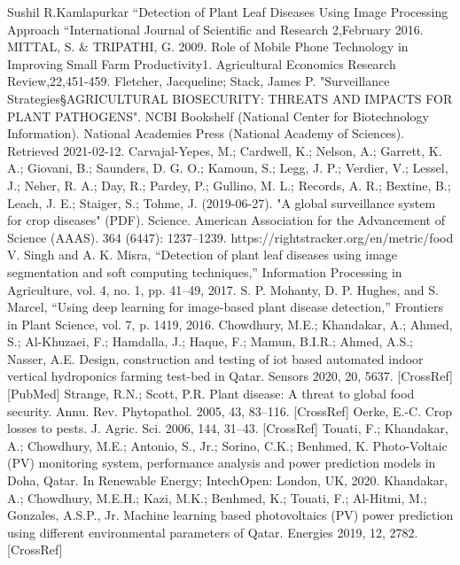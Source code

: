 \documentclass[11pt]{report}
\begin{document}
\begin{thebibliography}{100}  %

	 Sushil R.Kamlapurkar “Detection of Plant Leaf Diseases
	Using Image Processing Approach “International Journal of Scientific and Research 2,February 2016.
	 MITTAL, S. \& TRIPATHI, G. 2009. Role of Mobile Phone Technology in Improving Small Farm Productivity1. Agricultural Economics Research Review,22,451-459.
	  Fletcher, Jacqueline; Stack, James P. "Surveillance Strategies§AGRICULTURAL BIOSECURITY: THREATS AND IMPACTS FOR PLANT PATHOGENS". NCBI Bookshelf (National Center for Biotechnology Information). National Academies Press (National Academy of Sciences). Retrieved 2021-02-12.
	 Carvajal-Yepes, M.; Cardwell, K.; Nelson, A.; Garrett, K. A.; Giovani, B.; Saunders, D. G. O.; Kamoun, S.; Legg, J. P.; Verdier, V.; Lessel, J.; Neher, R. A.; Day, R.; Pardey, P.; Gullino, M. L.; Records, A. R.; Bextine, B.; Leach, J. E.; Staiger, S.; Tohme, J. (2019-06-27). "A global surveillance system for crop diseases" (PDF). Science. American Association for the Advancement of Science (AAAS). 364 (6447): 1237–1239. 
	 https://rightstracker.org/en/metric/food
	 V. Singh and A. K. Misra, “Detection of plant leaf diseases using image segmentation and soft computing techniques,” Information Processing in Agriculture, vol. 4, no. 1, pp. 41–49, 2017. 
	 S. P. Mohanty, D. P. Hughes, and S. Marcel, “Using deep learning for image-based plant disease detection,” Frontiers in Plant Science, vol. 7, p. 1419, 2016.
	 Chowdhury, M.E.; Khandakar, A.; Ahmed, S.; Al-Khuzaei, F.; Hamdalla, J.; Haque, F.; Mamun, B.I.R.; Ahmed, A.S.; Nasser, A.E.
	Design, construction and testing of iot based automated indoor vertical hydroponics farming test-bed in Qatar. Sensors 2020, 20,
	5637. [CrossRef] [PubMed]
	 Strange, R.N.; Scott, P.R. Plant disease: A threat to global food security. Annu. Rev. Phytopathol. 2005, 43, 83–116. [CrossRef]
	 Oerke, E.-C. Crop losses to pests. J. Agric. Sci. 2006, 144, 31–43. [CrossRef]
	 Touati, F.; Khandakar, A.; Chowdhury, M.E.; Antonio, S., Jr.; Sorino, C.K.; Benhmed, K. Photo-Voltaic (PV) monitoring system,
	performance analysis and power prediction models in Doha, Qatar. In Renewable Energy; IntechOpen: London, UK, 2020.
	 Khandakar, A.; Chowdhury, M.E.H.; Kazi, M.K.; Benhmed, K.; Touati, F.; Al-Hitmi, M.; Gonzales, A.S.P., Jr. Machine learning
	based photovoltaics (PV) power prediction using different environmental parameters of Qatar. Energies 2019, 12, 2782. [CrossRef]

\end{thebibliography}
\end{document}
